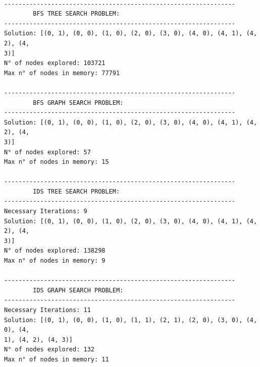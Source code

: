 \documentclass[11pt,oneside]{book}
\begin{document}
    \begin{Verbatim}[commandchars=\\\{\}]

----------------------------------------------------------------
        BFS TREE SEARCH PROBLEM:
----------------------------------------------------------------
Solution: [(0, 1), (0, 0), (1, 0), (2, 0), (3, 0), (4, 0), (4, 1), (4, 2), (4,
3)]
N° of nodes explored: 103721
Max n° of nodes in memory: 77791

----------------------------------------------------------------
        BFS GRAPH SEARCH PROBLEM:
----------------------------------------------------------------
Solution: [(0, 1), (0, 0), (1, 0), (2, 0), (3, 0), (4, 0), (4, 1), (4, 2), (4,
3)]
N° of nodes explored: 57
Max n° of nodes in memory: 15

----------------------------------------------------------------
        IDS TREE SEARCH PROBLEM:
----------------------------------------------------------------
Necessary Iterations: 9
Solution: [(0, 1), (0, 0), (1, 0), (2, 0), (3, 0), (4, 0), (4, 1), (4, 2), (4,
3)]
N° of nodes explored: 138298
Max n° of nodes in memory: 9

----------------------------------------------------------------
        IDS GRAPH SEARCH PROBLEM:
----------------------------------------------------------------
Necessary Iterations: 11
Solution: [(0, 1), (0, 0), (1, 0), (1, 1), (2, 1), (2, 0), (3, 0), (4, 0), (4,
1), (4, 2), (4, 3)]
N° of nodes explored: 132
Max n° of nodes in memory: 11
    \end{Verbatim}
\end{document}
